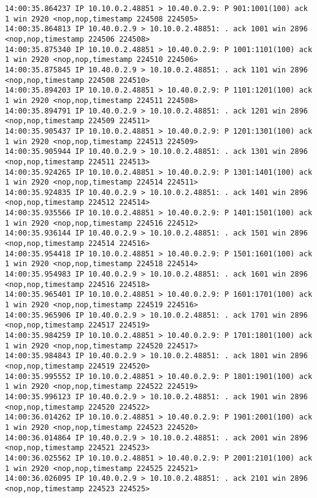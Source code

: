 \documentclass[a4paper,12pt]{article}
\begin{document}
\begin{lstlisting}
14:00:35.864237 IP 10.10.0.2.48851 > 10.40.0.2.9: P 901:1001(100) ack 1 win 2920 <nop,nop,timestamp 224508 224505>
14:00:35.864813 IP 10.40.0.2.9 > 10.10.0.2.48851: . ack 1001 win 2896 <nop,nop,timestamp 224506 224508>
14:00:35.875340 IP 10.10.0.2.48851 > 10.40.0.2.9: P 1001:1101(100) ack 1 win 2920 <nop,nop,timestamp 224510 224506>
14:00:35.875845 IP 10.40.0.2.9 > 10.10.0.2.48851: . ack 1101 win 2896 <nop,nop,timestamp 224508 224510>
14:00:35.894203 IP 10.10.0.2.48851 > 10.40.0.2.9: P 1101:1201(100) ack 1 win 2920 <nop,nop,timestamp 224511 224508>
14:00:35.894791 IP 10.40.0.2.9 > 10.10.0.2.48851: . ack 1201 win 2896 <nop,nop,timestamp 224509 224511>
14:00:35.905437 IP 10.10.0.2.48851 > 10.40.0.2.9: P 1201:1301(100) ack 1 win 2920 <nop,nop,timestamp 224513 224509>
14:00:35.905944 IP 10.40.0.2.9 > 10.10.0.2.48851: . ack 1301 win 2896 <nop,nop,timestamp 224511 224513>
14:00:35.924265 IP 10.10.0.2.48851 > 10.40.0.2.9: P 1301:1401(100) ack 1 win 2920 <nop,nop,timestamp 224514 224511>
14:00:35.924835 IP 10.40.0.2.9 > 10.10.0.2.48851: . ack 1401 win 2896 <nop,nop,timestamp 224512 224514>
14:00:35.935566 IP 10.10.0.2.48851 > 10.40.0.2.9: P 1401:1501(100) ack 1 win 2920 <nop,nop,timestamp 224516 224512>
14:00:35.936144 IP 10.40.0.2.9 > 10.10.0.2.48851: . ack 1501 win 2896 <nop,nop,timestamp 224514 224516>
14:00:35.954418 IP 10.10.0.2.48851 > 10.40.0.2.9: P 1501:1601(100) ack 1 win 2920 <nop,nop,timestamp 224518 224514>
14:00:35.954983 IP 10.40.0.2.9 > 10.10.0.2.48851: . ack 1601 win 2896 <nop,nop,timestamp 224516 224518>
14:00:35.965401 IP 10.10.0.2.48851 > 10.40.0.2.9: P 1601:1701(100) ack 1 win 2920 <nop,nop,timestamp 224519 224516>
14:00:35.965906 IP 10.40.0.2.9 > 10.10.0.2.48851: . ack 1701 win 2896 <nop,nop,timestamp 224517 224519>
14:00:35.984259 IP 10.10.0.2.48851 > 10.40.0.2.9: P 1701:1801(100) ack 1 win 2920 <nop,nop,timestamp 224520 224517>
14:00:35.984843 IP 10.40.0.2.9 > 10.10.0.2.48851: . ack 1801 win 2896 <nop,nop,timestamp 224519 224520>
14:00:35.995552 IP 10.10.0.2.48851 > 10.40.0.2.9: P 1801:1901(100) ack 1 win 2920 <nop,nop,timestamp 224522 224519>
14:00:35.996123 IP 10.40.0.2.9 > 10.10.0.2.48851: . ack 1901 win 2896 <nop,nop,timestamp 224520 224522>
14:00:36.014262 IP 10.10.0.2.48851 > 10.40.0.2.9: P 1901:2001(100) ack 1 win 2920 <nop,nop,timestamp 224523 224520>
14:00:36.014864 IP 10.40.0.2.9 > 10.10.0.2.48851: . ack 2001 win 2896 <nop,nop,timestamp 224521 224523>
14:00:36.025562 IP 10.10.0.2.48851 > 10.40.0.2.9: P 2001:2101(100) ack 1 win 2920 <nop,nop,timestamp 224525 224521>
14:00:36.026095 IP 10.40.0.2.9 > 10.10.0.2.48851: . ack 2101 win 2896 <nop,nop,timestamp 224523 224525>

\end{lstlisting}
\end{document}

